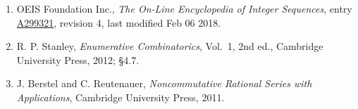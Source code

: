 \documentclass[11pt]{article}
\theoremstyle{definition}
\begin{document}
\begin{enumerate}

\item OEIS Foundation Inc., \emph{The On-Line Encyclopedia of Integer Sequences}, entry \href{https://oeis.org/A299321}{A299321}, revision 4, last modified Feb 06 2018.

\item R. P. Stanley, \emph{Enumerative Combinatorics}, Vol.~1, 2nd ed., Cambridge University Press, 2012; \S4.7.

\item J. Berstel and C. Reutenauer, \emph{Noncommutative Rational Series with Applications}, Cambridge University Press, 2011.

\end{enumerate}
\end{document}
